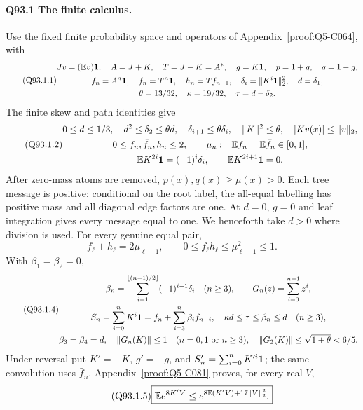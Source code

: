 \paragraph{Q93.1 The finite calculus.}
Use the fixed finite probability space and operators of
Appendix~\ref{proof:Q5-C064}, with
\begin{equation}\tag{Q93.1.1}\label{eq:Q93:1.1}
\begin{gathered}
Jv=(\mathbb E v)\mathbf1,\quad A=J+K,\quad T=J-K=A^*,\quad
g=K\mathbf1,\quad p=1+g,\quad q=1-g,\\
f_n=A^n\mathbf1,\quad\bar f_n=T^n\mathbf1,\quad h_n=Tf_{n-1},\quad
\delta_i=\|K^i\mathbf1\|_2^2,\quad d=\delta_1,\\
\theta=13/32,\quad\kappa=19/32,\quad\tau=d-\delta_2.
\end{gathered}
\end{equation}
The finite skew and path identities give
\begin{equation}\tag{Q93.1.2}\label{eq:Q93:1.2}
\begin{gathered}
0\le d\le1/3,\quad d^2\le\delta_2\le\theta d,\quad
\delta_{i+1}\le\theta\delta_i,\quad\|K\|^2\le\theta,\quad
|Kv(x)|\le\|v\|_2,\\
0\le f_n,\bar f_n,h_n\le2,\qquad
\mu_n:=\mathbb E f_n=\mathbb E\bar f_n\in[0,1],\\
\mathbb E K^{2i}\mathbf1=(-1)^i\delta_i,\qquad\mathbb E K^{2i+1}\mathbf1=0.
\end{gathered}
\end{equation}
After zero-mass atoms are removed, \(p(x),q(x)\ge\mu(x)>0\).
Each tree message is positive: conditional on the root label, the
all-equal labelling has positive mass and all diagonal edge factors
are one. At \(d=0\), \(g=0\) and leaf integration gives every message
equal to one. We henceforth take \(d>0\) where division is used.
For every genuine equal pair,
\begin{equation}\tag{Q93.1.3}\label{eq:Q93:1.3}
f_\ell+h_\ell=2\mu_{\ell-1},\qquad
0\le f_\ell h_\ell\le\mu_{\ell-1}^2\le1.
\end{equation}
With \(\beta_1=\beta_2=0\),
\begin{equation}\tag{Q93.1.4}\label{eq:Q93:1.4}
\begin{gathered}
\beta_n=\sum_{i=1}^{\lfloor(n-1)/2\rfloor}(-1)^{i-1}\delta_i
\quad(n\ge3),\qquad G_n(z)=\sum_{i=0}^{n-1}z^i,\\
S_n=\sum_{i=0}^nK^i\mathbf1=f_n+\sum_{i=3}^n\beta_i f_{n-i},
\quad\kappa d\le\tau\le\beta_n\le d\quad(n\ge3),\\
\beta_3=\beta_4=d,\quad
\|G_n(K)\|\le1\quad(n=0,1\text{ or }n\ge3),\quad
\|G_2(K)\|\le\sqrt{1+\theta}<6/5.
\end{gathered}
\end{equation}
Under reversal put \(K'=-K\), \(g'=-g\), and
\(S'_n=\sum_{i=0}^nK'^i\mathbf1\); the same convolution uses \(\bar f_n\).
Appendix~\ref{proof:Q5-C081} proves, for every real \(V\),
\begin{equation}\tag{Q93.1.5}\label{eq:Q93:1.5}
\boxed{\mathbb E e^{8K'V}\le e^{8\mathbb E(K'V)+17\|V\|_2^2}.}
\end{equation}

